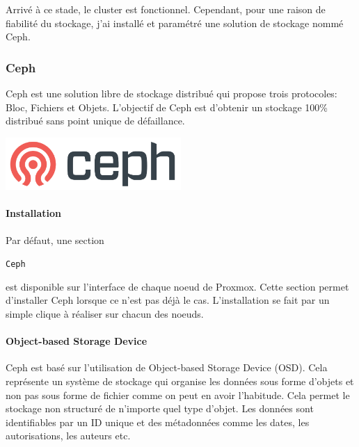 \documentclass[12pt]{article}
\begin{document}
Arrivé à ce stade, le \gls{cluster} est fonctionnel. 
Cependant, pour une raison de fiabilité du stockage, j'ai installé et paramétré une solution de stockage nommé \gls{Ceph}.

\subsubsection{Ceph}
\noindent%
\begin{minipage}{.7\textwidth}%
\gls{Ceph} est une solution libre de stockage distribué qui propose trois protocoles: Bloc, Fichiers et Objets.
L'objectif de \gls{Ceph} est d'obtenir un stockage 100\% distribué sans point unique de défaillance.

\end{minipage}%
\hfill
\begin{minipage}{.3\textwidth}%
\begin{center}
\includegraphics[width=0.5\textwidth]{src/logo_ceph.png}
\end{center}
\end{minipage}%

\paragraph{Installation}
Par défaut, une section \begin{code}\texttt{\gls{Ceph}}\end{code} est disponible sur l'interface de chaque noeud de \gls{Proxmox}. 
Cette section permet d'installer \gls{Ceph} lorsque ce n'est pas déjà le cas.
L'installation se fait par un simple clique à réaliser sur chacun des noeuds.

\paragraph{Object-based Storage Device}
\gls{Ceph} est basé sur l'utilisation de Object-based Storage Device (\gls{OSD}).
Cela représente un système de stockage qui organise les données sous forme d'objets et non pas sous forme de fichier comme on peut en avoir l'habitude.
Cela permet le stockage non structuré de n'importe quel type d'objet.
Les données sont identifiables par un ID unique et des métadonnées comme les dates, les autorisations, les auteurs etc.
\end{document}
